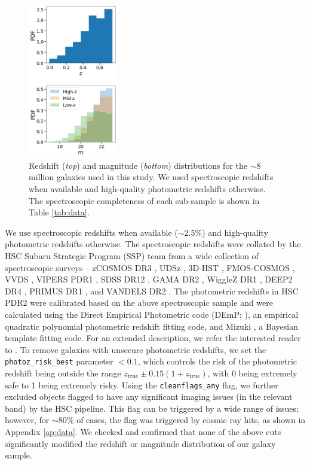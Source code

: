 \documentclass[linenumbers,twocolumn,twocolappendix]{aastex631}
\begin{document}
\begin{CJK*}{UTF8}{gbsn}
\begin{figure}[htb]
    \centering
    \includegraphics[width = 0.35\textwidth]{z_mag_distr.png}
    \caption{Redshift ({\it top}) and magnitude ({\it bottom}) distributions for the $\sim8$ million galaxies used in this study.
    We used spectroscopic redshifts when available and high-quality photometric redshifts otherwise. The spectroscopic completeness
    of each sub-sample is shown in Table \ref{tab:data}.}
    \label{fig:z_mag_distr}
\end{figure}

We use spectroscopic redshifts when available ($\sim 2.5\%$) and high-quality photometric redshifts otherwise. The spectroscopic redshifts were collated by the HSC Subaru Strategic Program (SSP) team from a wide collection of spectroscopic surveys -- zCOSMOS DR3 \citep{lilly_09}, UDSz \citep{bradshaw_13}, 3D-HST \citep{momcheva_16}, FMOS-COSMOS \citep{silverman_15}, VVDS \citep{lefevre_13}, VIPERS PDR1 \citep{garilli_14}, SDSS DR12 \citep{alam_15}, GAMA DR2 \citep{liske_15}, WiggleZ DR1 \citep{drinkwater_10}, DEEP2 DR4 \citep{newman_13}, PRIMUS DR1 \citep{cool_13}, and VANDELS DR2 \citep{vandels}. The photometric redshifts in HSC PDR2 were calibrated based on the above spectroscopic sample and were calculated using the Direct Empirical Photometric code (DEmP; \citeauthor{demp} \citeyear{demp}), an empirical
quadratic polynomial photometric redshift fitting code, and Mizuki \citep{mizuki}, a Bayesian template fitting code. For an extended description, we refer the interested reader to \citet{photoz_hsc_pdr2}. To remove galaxies with unsecure photometric redshifts, we set the \texttt{photoz\_risk\_best} parameter $<0.1$, which controls the risk of the photometric redshift being outside the range $z_{\mathrm{true}} \pm 0.15(1+z_{\mathrm{true}})$, with 0 being extremely safe to 1 being extremely risky. Using the \texttt{cleanflags\_any} flag, we further excluded objects flagged to have any significant imaging issues (in the relevant band) by the HSC pipeline. This flag can be triggered by a wide range of issues; however, for $\sim 80\%$ of cases, the flag was triggered by cosmic ray hits, as shown in Appendix \ref{ap:data}. We checked and confirmed that none of the above cuts significantly modified the redshift or magnitude distribution of our galaxy sample. 


\end{CJK*}
\end{document}
